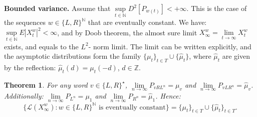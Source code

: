 \documentclass[10pt]{amsart}
\newtheorem{theorem}{Theorem}
\theoremstyle{definition}
\numberwithin{equation}{section}
\newcommand{\N}{\mathbb{N}}
\newcommand{\Z}{\mathbb{Z}}
\newcommand{\LL}{\mathcal{L}}
\begin{document}
\textbf{Bounded variance.} Assume that $\sup\limits_{t\in\N}D^2[P_{w(t)}]<+\infty$. This is the case of the sequences $w\in\{L,R\}^{\N}$ that are eventually constant. We have: $\sup\limits_{t\in\N}E|X^w_t|^2<\infty$, and by Doob theorem, the almost sure limit $X^w_{\infty}=\lim\limits_{t\to\infty}X^w_t$ exists, and equals to the $L^2$- norm limit. The limit can be written explicitly, and the asymptotic distributions form the family $\{\mu_t\}_{t\in T}\cup \{\hat{\mu}_t\}$,  where $\hat{\mu}_t$ are given by the reflection: $\hat{\mu}_t(d)=\mu_t(-d)$, $d\in\Z$.
\begin{theorem}\label{As}
  For any word $v\in\{L,R\}^{\star}$, $\lim\limits_{n\to\infty} P_{vRL^n}= \mu_v$ and $\lim\limits_{n\to\infty} P_{vLR^n}= \hat{\mu}_v$. 
Additionally: $\lim\limits_{n\to\infty}P_{L^n}=\mu_1$ and 
$\lim\limits_{n\to\infty}P_{R^n}=\hat{\mu}_1$. Hence:
 $$\{\LL(X^w_{\infty})\colon w \in\{L,R\}^\N\mbox{ is eventually constant}\}=\{\mu_t\}_{t\in T}\cup \{\hat{\mu}_t\}_{t\in T}.$$

\end{theorem}
\end{document}
